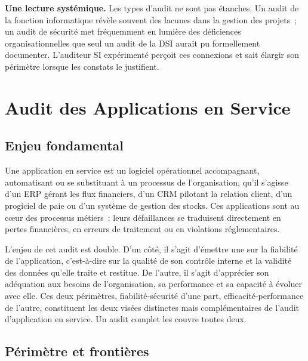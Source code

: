 \begin{boxinfo}
\textbf{Une lecture systémique.} Les types d'audit ne sont pas étanches. Un audit
de la fonction informatique révèle souvent des lacunes dans la gestion des projets~;
un audit de sécurité met fréquemment en lumière des déficiences organisationnelles
que seul un audit de la DSI aurait pu formellement documenter. L'auditeur SI
expérimenté perçoit ces connexions et sait élargir son périmètre lorsque les
constats le justifient.
\end{boxinfo}


\section{Audit des Applications en Service}
\label{sec:audit-appli}

\subsection{Enjeu fondamental}

Une application en service est un logiciel opérationnel accompagnant, automatisant
ou se substituant à un processus de l'organisation, qu'il s'agisse d'un ERP gérant
les flux financiers, d'un CRM pilotant la relation client, d'un progiciel de paie ou
d'un système de gestion des stocks. Ces applications sont au cœur des processus
métiers~: leurs défaillances se traduisent directement en pertes financières, en
erreurs de traitement ou en violations réglementaires.

L'enjeu de cet audit est double. D'un côté, il s'agit d'émettre une
 sur la fiabilité de l'application, c'est-à-dire
sur la qualité de son contrôle interne et la validité des données qu'elle traite
et restitue. De l'autre, il s'agit d'apprécier son adéquation aux besoins de
l'organisation, sa performance et sa capacité à évoluer avec elle. Ces deux
périmètres, fiabilité-sécurité d'une part, efficacité-performance de l'autre,
constituent les deux visées distinctes mais complémentaires de l'audit d'application
en service. Un audit complet les couvre toutes deux.

\subsection{Périmètre et frontières}


